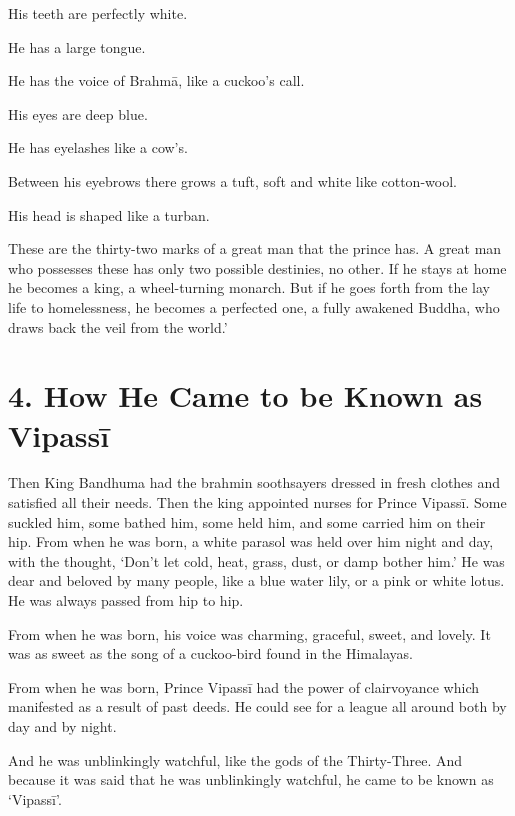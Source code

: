 \documentclass[12pt,openany]{book}%
\begin{document}
His teeth are perfectly white. 

He has a large tongue. 

He has the voice of \textsanskrit{Brahmā}, like a cuckoo’s call. 

His eyes are deep blue. 

He has eyelashes like a cow’s. 

Between his eyebrows there grows a tuft, soft and white like cotton-wool. 

His head is shaped like a turban. 

These are the thirty-two marks of a great man that the prince has. A great man who possesses these has only two possible destinies, no other. If he stays at home he becomes a king, a wheel-turning monarch. But if he goes forth from the lay life to homelessness, he becomes a perfected one, a fully awakened Buddha, who draws back the veil from the world.’ 

\section*{4. How He Came to be Known as \textsanskrit{Vipassī} }

Then King Bandhuma had the brahmin soothsayers dressed in fresh clothes and satisfied all their needs. Then the king appointed nurses for Prince \textsanskrit{Vipassī}. Some suckled him, some bathed him, some held him, and some carried him on their hip. From when he was born, a white parasol was held over him night and day, with the thought, ‘Don’t let cold, heat, grass, dust, or damp bother him.’ He was dear and beloved by many people, like a blue water lily, or a pink or white lotus. He was always passed from hip to hip. 

From when he was born, his voice was charming, graceful, sweet, and lovely. It was as sweet as the song of a cuckoo-bird found in the Himalayas. 

From when he was born, Prince \textsanskrit{Vipassī} had the power of clairvoyance which manifested as a result of past deeds. He could see for a league all around both by day and by night. 

And he was unblinkingly watchful, like the gods of the Thirty-Three. And because it was said that he was unblinkingly watchful, he came to be known as ‘\textsanskrit{Vipassī}’. 
\end{document}

